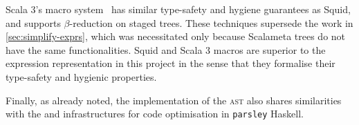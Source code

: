 \documentclass[../../main.tex]{subfiles}
\begin{document}
Scala 3's macro system~\cite{stucki_multi-stage_2021} has similar type-safety and hygiene guarantees as Squid, and supports $\beta$-reduction on staged  trees.
These techniques supersede the work in \cref{sec:simplify-exprs}, which was necessitated only because Scalameta trees do not have the same functionalities.
Squid and Scala 3 macros are superior to the expression representation in this project in the sense that they formalise their type-safety and hygienic properties.

Finally, as already noted, the implementation of the  \textsc{ast} also shares similarities with the  and  infrastructures for code optimisation in \texttt{parsley} Haskell.

\end{document}
